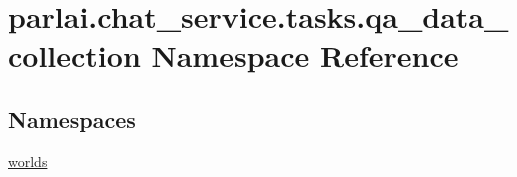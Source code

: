 \hypertarget{namespaceparlai_1_1chat__service_1_1tasks_1_1qa__data__collection}{}\section{parlai.\+chat\+\_\+service.\+tasks.\+qa\+\_\+data\+\_\+collection Namespace Reference}
\label{namespaceparlai_1_1chat__service_1_1tasks_1_1qa__data__collection}
\subsection*{Namespaces}
\begin{DoxyCompactItemize}
\item 
 \hyperlink{namespaceparlai_1_1chat__service_1_1tasks_1_1qa__data__collection_1_1worlds}{worlds}
\end{DoxyCompactItemize}
